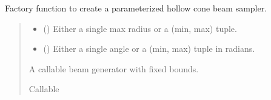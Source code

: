 \documentclass[letterpaper,10pt,english]{sphinxmanual}
\begin{document}
\begin{fulllineitems}
\label{\detokenize{generated/photon_canon.hardware:photon_canon.hardware.create_hollow_cone_beam}}
\pysigstartsignatures
\pysiglinewithargsret
{}
{\sphinxparamcomma {}}
{}
\pysigstopsignatures
\sphinxAtStartPar
Factory function to create a parameterized hollow cone beam sampler.
\begin{quote}\begin{description}
\begin{itemize}
\item {} 
\sphinxAtStartPar
{} (\sphinxstyleliteralemphasis{\sphinxupquote{{[}}}\sphinxstyleliteralemphasis{\sphinxupquote{, }}\sphinxstyleliteralemphasis{\sphinxupquote{{[}}}\sphinxstyleliteralemphasis{\sphinxupquote{, }}\sphinxstyleliteralemphasis{\sphinxupquote{{]}}}\sphinxstyleliteralemphasis{\sphinxupquote{{]}}}) \textendash{} Either a single max radius or a (min, max) tuple.

\item {} 
\sphinxAtStartPar
{} (\sphinxstyleliteralemphasis{\sphinxupquote{{[}}}\sphinxstyleliteralemphasis{\sphinxupquote{, }}\sphinxstyleliteralemphasis{\sphinxupquote{{[}}}\sphinxstyleliteralemphasis{\sphinxupquote{, }}\sphinxstyleliteralemphasis{\sphinxupquote{{]}}}\sphinxstyleliteralemphasis{\sphinxupquote{{]}}}) \textendash{} Either a single angle or a (min, max) tuple in radians.

\end{itemize}

\sphinxAtStartPar
A callable beam generator with fixed bounds.

\sphinxAtStartPar
Callable

\end{description}\end{quote}

\end{fulllineitems}
\end{document}
